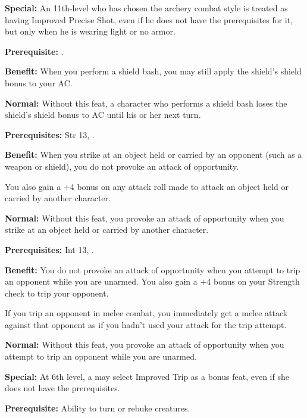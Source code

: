 \textbf{Special:} An 11th-level  who has chosen the archery combat style is treated as having 
Improved Precise Shot, even if he does not have the prerequisites for it, but only 
when he is wearing light or no armor.


\textbf{Prerequisite:} .

\textbf{Benefit:} When you perform a shield bash, you may still apply the shield's 
shield bonus to your AC.

\textbf{Normal:} Without this feat, a character who performs a shield bash loses 
the shield's shield bonus to AC until his or her next turn.


\textbf{Prerequisites:} Str 13, .

\textbf{Benefit:} When you strike at an object held or carried by an opponent (such 
as a weapon or shield), you do not provoke an attack of opportunity.

You also gain a +4 bonus on any attack roll made to attack an object held or carried 
by another character.

\textbf{Normal:} Without this feat, you provoke an attack of opportunity when you 
strike at an object held or carried by another character.


\textbf{Prerequisites:} Int 13, .

\textbf{Benefit:} You do not provoke an attack of opportunity when you attempt 
to trip an opponent while you are unarmed. You also gain a +4 bonus on your Strength 
check to trip your opponent.

If you trip an opponent in melee combat, you immediately get a melee attack against 
that opponent as if you hadn't used your attack for the trip attempt. 

\textbf{Normal:} Without this feat, you provoke an attack of opportunity when you 
attempt to trip an opponent while you are unarmed.

\textbf{Special:} At 6th level, a  may select Improved Trip as a bonus feat, 
even if she does not have the prerequisites.


\textbf{Prerequisite:} Ability to turn or rebuke creatures.

